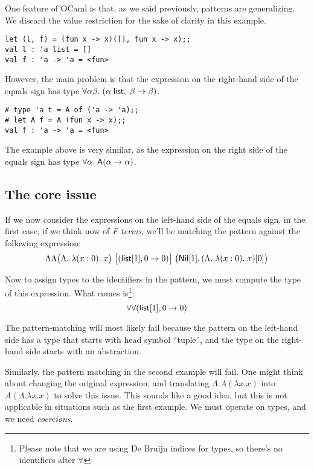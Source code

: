 \documentclass[10pt,a4paper,twoside,titlepage,twocolumn]{article}
\begin{document}
One feature of OCaml is that, as we said previously, patterns are generalizing.
We discard the value restriction for the sake of clarity in this example.

\begin{verbatim}
let (l, f) = (fun x -> x)([], fun x -> x);;
val l : 'a list = []
val f : 'a -> 'a = <fun>
\end{verbatim}

However, the main problem is that the expression on the right-hand side of the
equals sign has type $\forall\alpha\beta.\; (\alpha\;\text{\textsf{list}},\;\beta\to\beta)$.

\begin{verbatim}
# type 'a t = A of ('a -> 'a);;
# let A f = A (fun x -> x);;
val f : 'a -> 'a = <fun>
\end{verbatim}

The example above is very similar, as the expression on the right side of the
equals sign has type $\forall\alpha.\; \text{\textsf{A}} (\alpha\to\alpha)$.

\subsection{The core issue}

If we now consider the expressions on the left-hand side of the equals sign, in
the first case, if we think now of \emph{F terms}, we'll be matching the pattern
against the following expression:
$$\Lambda\Lambda \big(\Lambda.\;\lambda (x: 0).\; x\big)
\;\big[(\text{\textsf{list}}[1], 0\to0)\big]
\;\big(\text{\textsf{Nil}}[1], (\Lambda.\;\lambda (x: 0).\; x) [0]\big)
$$

Now to assign types to the identifiers in the pattern, we must compute the type
of this expression. What comes is\footnote{Please note that we are using De Bruijn
indices for types, so there's no identifiers after $\forall$}:
$$\forall\forall(\text{\textsf{list}}[1],0\to0)$$

The pattern-matching will most likely fail because the pattern on the left-hand
side has a type that starts with head symbol ``tuple'', and the type on
the right-hand side starts with an abstraction.

Similarly, the pattern matching in the second example will fail. One
might think about changing the original expression, and translating $\Lambda.  A(\lambda x. x)$ into $A
(\Lambda.\lambda x. x)$ to solve this issue. This sounds like a good idea, but
this is not applicable in situations such as the first example. We must operate
on types, and we need \emph{coercions}.
\end{document}
